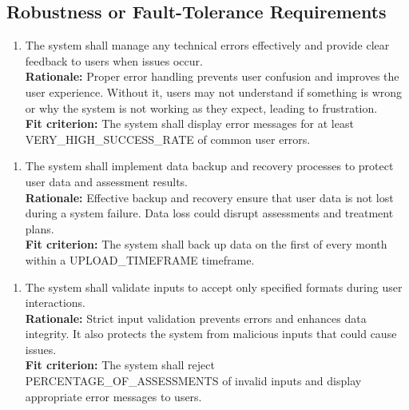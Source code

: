 \documentclass[12pt]{article}
\begin{document}
\subsection{Robustness or Fault-Tolerance Requirements}
\begin{enumerate}[label={PR-RFT}1. ]
  \item The system shall manage any technical errors effectively and provide clear feedback to users when issues occur.\\
  \textbf{Rationale: }Proper error handling prevents user confusion and improves the user experience. Without it, users may not understand if something is wrong or why the system is not working as they expect, leading to frustration.\\
  \textbf{Fit criterion: }The system shall display error messages for at least VERY\_HIGH\_SUCCESS\_RATE of common user errors.  
\end{enumerate}
\begin{enumerate}[label={PR-RFT}2. ]
  \item The system shall implement data backup and recovery processes to protect user data and assessment results.\\
  \textbf{Rationale: }Effective backup and recovery ensure that user data is not lost during a system failure. Data loss could disrupt assessments and treatment plans.\\
  \textbf{Fit criterion: }The system shall back up data on the first of every month within a UPLOAD\_TIMEFRAME timeframe.  
\end{enumerate}
\begin{enumerate}[label={PR-RFT}3. ]
  \item The system shall validate inputs to accept only specified formats during user interactions.\\
  \textbf{Rationale: }Strict input validation prevents errors and enhances data integrity. It also protects the system from malicious inputs that could cause issues.\\
  \textbf{Fit criterion: }The system shall reject\\ PERCENTAGE\_OF\_ASSESSMENTS of invalid inputs and display appropriate error messages to users.  
\end{enumerate}
\end{document}
